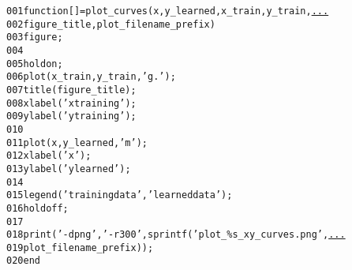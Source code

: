 \begin{alltt}
\textcolor{linenr}{001  }\textcolor{keyword}{function} [] = plot\_curves(x, y\_learned, x\_train, y\_train, \textcolor{keyword}{\underline{...}}
\textcolor{linenr}{002  }    figure\_title, plot\_filename\_prefix)
\textcolor{linenr}{003  }    figure;
\textcolor{linenr}{004  }      
\textcolor{linenr}{005  }    hold on;
\textcolor{linenr}{006  }    plot(x\_train, y\_train, \textcolor{string}{'g.'});
\textcolor{linenr}{007  }    title(figure\_title);
\textcolor{linenr}{008  }    xlabel(\textcolor{string}{'x training'});
\textcolor{linenr}{009  }    ylabel(\textcolor{string}{'y training'});
\textcolor{linenr}{010  }   
\textcolor{linenr}{011  }    plot(x, y\_learned, \textcolor{string}{'m'}); 
\textcolor{linenr}{012  }    xlabel(\textcolor{string}{'x'});
\textcolor{linenr}{013  }    ylabel(\textcolor{string}{'y learned'});
\textcolor{linenr}{014  }      
\textcolor{linenr}{015  }    legend(\textcolor{string}{'training data'}, \textcolor{string}{'learned data'});
\textcolor{linenr}{016  }    hold off;
\textcolor{linenr}{017  }      
\textcolor{linenr}{018  }    print(\textcolor{string}{'-dpng'}, \textcolor{string}{'-r300'}, sprintf(\textcolor{string}{'plot\_\%s\_xy\_curves.png'}, \textcolor{keyword}{\underline{...}}
\textcolor{linenr}{019  }       plot\_filename\_prefix));
\textcolor{linenr}{020  }\textcolor{keyword}{end}
\end{alltt}
